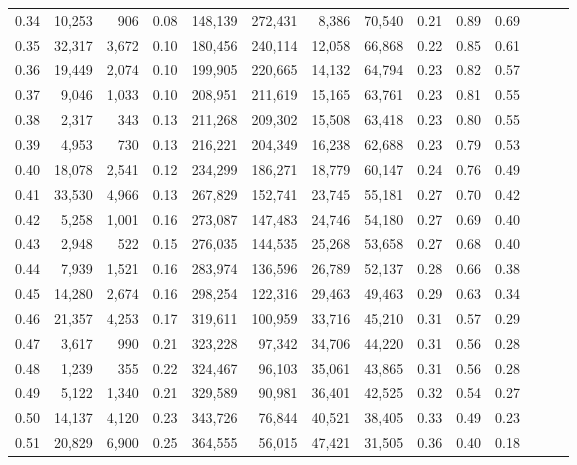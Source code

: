 \begin{tabular}{rrrrrrrrrrrrrr}
0.34 &  10,253 &    906 &  0.08 &  148,139 &  272,431 &   8,386 &  70,540 &  0.21 &  0.89 &      0.69 \\
0.35 &  32,317 &  3,672 &  0.10 &  180,456 &  240,114 &  12,058 &  66,868 &  0.22 &  0.85 &      0.61 \\
0.36 &  19,449 &  2,074 &  0.10 &  199,905 &  220,665 &  14,132 &  64,794 &  0.23 &  0.82 &      0.57 \\
0.37 &   9,046 &  1,033 &  0.10 &  208,951 &  211,619 &  15,165 &  63,761 &  0.23 &  0.81 &      0.55 \\
0.38 &   2,317 &    343 &  0.13 &  211,268 &  209,302 &  15,508 &  63,418 &  0.23 &  0.80 &      0.55 \\
0.39 &   4,953 &    730 &  0.13 &  216,221 &  204,349 &  16,238 &  62,688 &  0.23 &  0.79 &      0.53 \\
0.40 &  18,078 &  2,541 &  0.12 &  234,299 &  186,271 &  18,779 &  60,147 &  0.24 &  0.76 &      0.49 \\
0.41 &  33,530 &  4,966 &  0.13 &  267,829 &  152,741 &  23,745 &  55,181 &  0.27 &  0.70 &      0.42 \\
0.42 &   5,258 &  1,001 &  0.16 &  273,087 &  147,483 &  24,746 &  54,180 &  0.27 &  0.69 &      0.40 \\
0.43 &   2,948 &    522 &  0.15 &  276,035 &  144,535 &  25,268 &  53,658 &  0.27 &  0.68 &      0.40 \\
0.44 &   7,939 &  1,521 &  0.16 &  283,974 &  136,596 &  26,789 &  52,137 &  0.28 &  0.66 &      0.38 \\
0.45 &  14,280 &  2,674 &  0.16 &  298,254 &  122,316 &  29,463 &  49,463 &  0.29 &  0.63 &      0.34 \\
0.46 &  21,357 &  4,253 &  0.17 &  319,611 &  100,959 &  33,716 &  45,210 &  0.31 &  0.57 &      0.29 \\
0.47 &   3,617 &    990 &  0.21 &  323,228 &   97,342 &  34,706 &  44,220 &  0.31 &  0.56 &      0.28 \\
0.48 &   1,239 &    355 &  0.22 &  324,467 &   96,103 &  35,061 &  43,865 &  0.31 &  0.56 &      0.28 \\
0.49 &   5,122 &  1,340 &  0.21 &  329,589 &   90,981 &  36,401 &  42,525 &  0.32 &  0.54 &      0.27 \\
0.50 &  14,137 &  4,120 &  0.23 &  343,726 &   76,844 &  40,521 &  38,405 &  0.33 &  0.49 &      0.23 \\
0.51 &  20,829 &  6,900 &  0.25 &  364,555 &   56,015 &  47,421 &  31,505 &  0.36 &  0.40 &      0.18 \\

\end{tabular}
